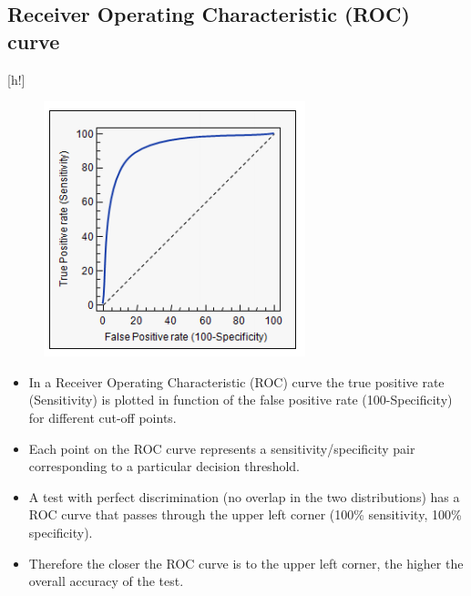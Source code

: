 \documentclass[]{report}
\begin{document}
\subsection*{Receiver Operating Characteristic (ROC) curve}[h!]
\begin{figure}
\centering
\includegraphics[width=0.55\linewidth]{images/ROCcurve}
\caption{}
\label{fig:roccurve}
\end{figure}
\begin{itemize}
	\item In a Receiver Operating Characteristic (ROC) curve the true positive rate
	(Sensitivity) is plotted in function of the false positive rate (100-Specificity)
	for different cut-off points. 
	\item Each point on the ROC curve represents a sensitivity/specificity
	pair corresponding to a particular decision threshold. 
	\item A
	test with perfect discrimination (no overlap in the two distributions) has a
	ROC curve that passes through the upper left corner (100\% sensitivity, 100\%
	specificity). 
	\item Therefore the closer the ROC curve is to the upper left corner,
	the higher the overall accuracy of the test. %
\end{itemize}
\end{document}
